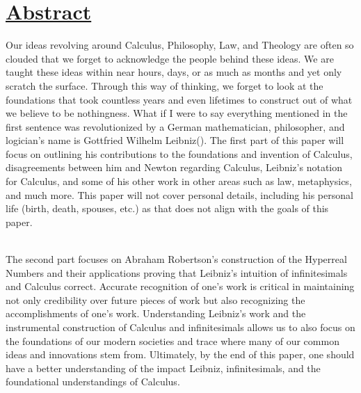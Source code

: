 \documentclass[12pt]{report}
\begin{document}

    \newpage
{}
    \newpage



\newpage
\section*{\underline{Abstract}}
Our ideas revolving around Calculus, Philosophy, Law, and Theology are often so clouded that we forget to acknowledge the people behind these ideas.
We are taught these ideas within near hours, days, or as much as months and yet only scratch the surface.
Through this way of thinking, we forget to look at the foundations that took countless years and even lifetimes to construct out of what we believe to be nothingness.
What if I were to say everything mentioned in the first sentence was revolutionized by a German mathematician, philosopher, and logician's name is Gottfried Wilhelm Leibniz().
The first part of this paper will focus on outlining his contributions to the foundations and invention of Calculus, disagreements between him and Newton regarding Calculus, Leibniz's notation for Calculus, and some of his other work in other areas such as law, metaphysics, and much more.
This paper will not cover personal details, including his personal life (birth, death, spouses, etc.) as that does not align with the goals of this paper.\par \\
\newline The second part focuses on Abraham Robertson's construction of the Hyperreal Numbers and their applications proving that Leibniz's intuition of infinitesimals and Calculus correct.
Accurate recognition of one's work is critical in maintaining not only credibility over future pieces of work but also recognizing the accomplishments of one's work.
Understanding Leibniz's work and the instrumental construction of Calculus and infinitesimals allows us to also focus on the foundations of our modern societies and trace where many of our common ideas and innovations stem from.
Ultimately, by the end of this paper, one should have a better understanding of the impact Leibniz, infinitesimals, and the foundational understandings of Calculus.
\newpage
\end{document}
